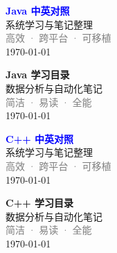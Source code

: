 \documentclass[UTF8, a4paper, 12pt]{ctexart}
\begin{document}

\clearpage

\thispagestyle{empty}
\vspace*{\fill}
\begin{center}
    \textcolor{blue}{\Huge\textbf{Java 中英对照}} \\[1em]
    \textcolor{blue!60!black}{\Large 系统学习与笔记整理} \\[2em]
    \textcolor{gray}{\large 高效 · 跨平台 · 可移植} \\[1m]
    \today
\end{center}
\vspace*{\fill}
\clearpage


\clearpage
\thispagestyle{empty}
\vspace*{\fill}
\begin{center}
    \textcolor{green!70!black}{\Huge\textbf{Java 学习目录}} \\[1em]
    \textcolor{green!40!black}{\Large 数据分析与自动化笔记} \\[2em]
    \textcolor{gray}{\large 简洁 · 易读 · 全能} \\[1em]
    \today
\end{center}
\vspace*{\fill}
\clearpage


\clearpage

\thispagestyle{empty}
\vspace*{\fill}
\begin{center}
    \textcolor{blue}{\Huge\textbf{C++ 中英对照}} \\[1em]
    \textcolor{blue!60!black}{\Large 系统学习与笔记整理} \\[2em]
    \textcolor{gray}{\large 高效 · 跨平台 · 可移植} \\[1m]
    \today
\end{center}
\vspace*{\fill}
\clearpage


\clearpage
\thispagestyle{empty}
\vspace*{\fill}
\begin{center}
    \textcolor{green!70!black}{\Huge\textbf{C++ 学习目录}} \\[1em]
    \textcolor{green!40!black}{\Large 数据分析与自动化笔记} \\[2em]
    \textcolor{gray}{\large 简洁 · 易读 · 全能} \\[1em]
    \today
\end{center}
\vspace*{\fill}
\clearpage
\end{document}
